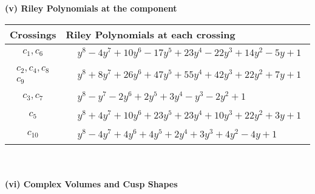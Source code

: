 \documentclass[1p]{elsarticle_modified}
\theoremstyle{definition}
\begin{document}
\newpage\renewcommand{\arraystretch}{1}
\flushleft \textbf{(v) Riley Polynomials at the component}\newline \\
\begin{tabular}{m{50pt}|m{274pt}}
Crossings & \hspace{64pt}Riley Polynomials at each crossing \\
\hline $$\begin{aligned}c_{1},c_{6}\end{aligned}$$&$\begin{aligned}
&y^8-4 y^7+10 y^6-17 y^5+23 y^4-22 y^3+14 y^2-5 y+1
\end{aligned}$\\
\hline $$\begin{aligned}c_{2},c_{4},c_{8}\\c_{9}\end{aligned}$$&$\begin{aligned}
&y^8+8 y^7+26 y^6+47 y^5+55 y^4+42 y^3+22 y^2+7 y+1
\end{aligned}$\\
\hline $$\begin{aligned}c_{3},c_{7}\end{aligned}$$&$\begin{aligned}
&y^8- y^7-2 y^6+2 y^5+3 y^4- y^3-2 y^2+1
\end{aligned}$\\
\hline $$\begin{aligned}c_{5}\end{aligned}$$&$\begin{aligned}
&y^8+4 y^7+10 y^6+23 y^5+23 y^4+10 y^3+22 y^2+3 y+1
\end{aligned}$\\
\hline $$\begin{aligned}c_{10}\end{aligned}$$&$\begin{aligned}
&y^8-4 y^7+4 y^6+4 y^5+2 y^4+3 y^3+4 y^2-4 y+1
\end{aligned}$\\
\hline
\end{tabular}\\~\\
\newpage\flushleft \textbf{(vi) Complex Volumes and Cusp Shapes}
\end{document}

